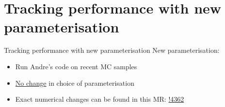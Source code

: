 \documentclass[xcolor={dvipsnames}]{beamer}
\begin{document}
\section{Tracking performance with new parameterisation}

\begin{frame}{Tracking performance with new parameterisation}
  \vspace{0.0cm}
  {\Large New parameterisation:}
  \vspace{0.5cm}
  \begin{itemize}
    \setlength\itemsep{1.5em}
    \item{Run Andre's code on recent MC samples}
    \item{\underline{No change} in choice of parameterisation}
    \item{Exact numerical changes can be found in this MR: \href{https://gitlab.cern.ch/lhcb/Rec/-/merge_requests/4362}{!4362}}
  \end{itemize}
\end{frame}
\end{document}
